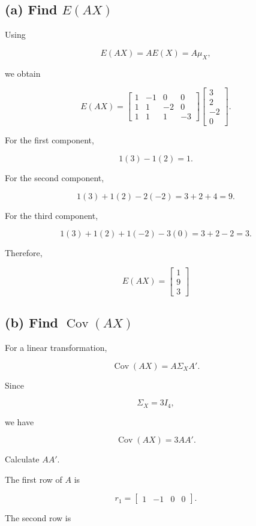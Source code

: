 \documentclass[12pt]{article}
\begin{document}
\subsection*{(a) Find $E(AX)$}

Using

\[
E(AX)=AE(X)=A\mu_X,
\]

we obtain

\[
E(AX)
=
\begin{bmatrix}
1&-1&0&0\\
1&1&-2&0\\
1&1&1&-3
\end{bmatrix}
\begin{bmatrix}
3\\
2\\
-2\\
0
\end{bmatrix}.
\]

For the first component,

\[
1(3)-1(2)=1.
\]

For the second component,

\[
1(3)+1(2)-2(-2)
=
3+2+4
=
9.
\]

For the third component,

\[
1(3)+1(2)+1(-2)-3(0)
=
3+2-2
=
3.
\]

Therefore,

\[
\boxed{
E(AX)
=
\begin{bmatrix}
1\\
9\\
3
\end{bmatrix}}
\]

\subsection*{(b) Find $\operatorname{Cov}(AX)$}

For a linear transformation,

\[
\operatorname{Cov}(AX)
=
A\Sigma_XA'.
\]

Since

\[
\Sigma_X=3I_4,
\]

we have

\[
\operatorname{Cov}(AX)
=
3AA'.
\]

Calculate $AA'$.

The first row of $A$ is

\[
r_1=
\begin{bmatrix}
1&-1&0&0
\end{bmatrix}.
\]

The second row is
\end{document}
